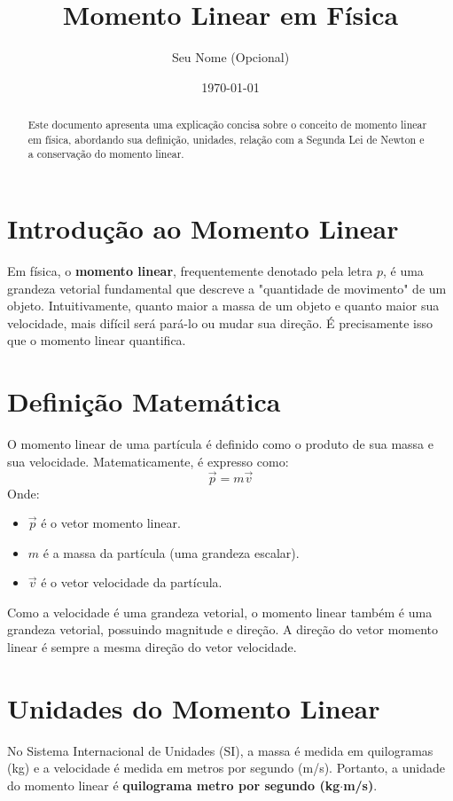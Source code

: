 \documentclass{article}
\title{Momento Linear em Física}
\author{Seu Nome (Opcional)}
\date{\today}
\begin{document}
\maketitle

\begin{abstract}
Este documento apresenta uma explicação concisa sobre o conceito de momento linear em física, abordando sua definição, unidades, relação com a Segunda Lei de Newton e a conservação do momento linear.
\end{abstract}

\section{Introdução ao Momento Linear}
Em física, o \textbf{momento linear}, frequentemente denotado pela letra $p$, é uma grandeza vetorial fundamental que descreve a "quantidade de movimento" de um objeto. Intuitivamente, quanto maior a massa de um objeto e quanto maior sua velocidade, mais difícil será pará-lo ou mudar sua direção. É precisamente isso que o momento linear quantifica.

\section{Definição Matemática}
O momento linear de uma partícula é definido como o produto de sua massa e sua velocidade. Matematicamente, é expresso como:
$$ \vec{p} = m \vec{v} $$
Onde:
\begin{itemize}
    \item $\vec{p}$ é o vetor momento linear.
    \item $m$ é a massa da partícula (uma grandeza escalar).
    \item $\vec{v}$ é o vetor velocidade da partícula.
\end{itemize}
Como a velocidade é uma grandeza vetorial, o momento linear também é uma grandeza vetorial, possuindo magnitude e direção. A direção do vetor momento linear é sempre a mesma direção do vetor velocidade.

\section{Unidades do Momento Linear}
No Sistema Internacional de Unidades (SI), a massa é medida em quilogramas (kg) e a velocidade é medida em metros por segundo (m/s). Portanto, a unidade do momento linear é \textbf{quilograma metro por segundo (kg$\cdot$m/s)}.
\end{document}
